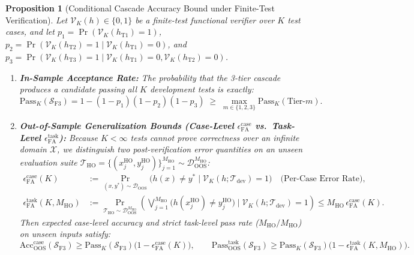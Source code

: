 \documentclass[10pt,a4paper]{article}
\newtheorem{proposition}{Proposition}
\begin{document}
\begin{proposition}[Conditional Cascade Accuracy Bound under Finite-Test Verification]
\label{prop:swarm_dominance}
Let $\mathcal{V}_K(h) \in \{0, 1\}$ be a finite-test functional verifier over $K$ test cases, and let $p_1 = \Pr(\mathcal{V}_K(h_{\text{T1}})=1)$, $p_2 = \Pr(\mathcal{V}_K(h_{\text{T2}})=1 \mid \mathcal{V}_K(h_{\text{T1}})=0)$, and $p_3 = \Pr(\mathcal{V}_K(h_{\text{T3}})=1 \mid \mathcal{V}_K(h_{\text{T1}})=0, \mathcal{V}_K(h_{\text{T2}})=0)$.
\begin{enumerate}
    \item \textbf{In-Sample Acceptance Rate:} The probability that the 3-tier cascade produces a candidate passing all $K$ development tests is exactly:
    \begin{equation}
    \label{eq:swarm_acc_insample}
    \text{Pass}_K(\mathcal{S}_{\text{F3}}) = 1 - (1 - p_1)(1 - p_2)(1 - p_3) \;\ge\; \max_{m \in \{1,2,3\}} \text{Pass}_K(\text{Tier-}m).
    \end{equation}
    \item \textbf{Out-of-Sample Generalization Bounds (Case-Level $\epsilon_{\text{FA}}^{\text{case}}$ vs.\ Task-Level $\epsilon_{\text{FA}}^{\text{task}}$):} Because $K < \infty$ tests cannot prove correctness over an infinite domain $\mathcal{X}$, we distinguish two post-verification error quantities on an unseen evaluation suite $\mathcal{T}_{\text{HO}} = \{(x_j^{\text{HO}}, y_j^{\text{HO}})\}_{j=1}^{M_{\text{HO}}} \sim \mathcal{D}_{\text{OOS}}^{M_{\text{HO}}}$:
    \begin{align}
    \epsilon_{\text{FA}}^{\text{case}}(K) &:= \Pr_{(x, y^*) \sim \mathcal{D}_{\text{OOS}}}\!\big(h(x) \neq y^* \;\big|\; \mathcal{V}_K(h; \mathcal{T}_{\text{dev}}) = 1\big) \quad \text{(Per-Case Error Rate)}, \\
    \epsilon_{\text{FA}}^{\text{task}}(K, M_{\text{HO}}) &:= \Pr_{\mathcal{T}_{\text{HO}} \sim \mathcal{D}_{\text{OOS}}^{M_{\text{HO}}}}\!\left(\bigvee_{j=1}^{M_{\text{HO}}} \big(h(x_j^{\text{HO}}) \neq y_j^{\text{HO}}\big) \;\Bigg|\; \mathcal{V}_K(h; \mathcal{T}_{\text{dev}}) = 1\right) \le M_{\text{HO}}\,\epsilon_{\text{FA}}^{\text{case}}(K).
    \end{align}
    Then expected case-level accuracy and strict task-level pass rate ($M_{\text{HO}}/M_{\text{HO}}$) on unseen inputs satisfy:
    \begin{equation}
    \label{eq:swarm_acc_oos}
    \text{Acc}_{\text{OOS}}^{\text{case}}(\mathcal{S}_{\text{F3}}) \ge \text{Pass}_K(\mathcal{S}_{\text{F3}})\big(1 - \epsilon_{\text{FA}}^{\text{case}}(K)\big), \qquad
    \text{Pass}_{\text{OOS}}^{\text{task}}(\mathcal{S}_{\text{F3}}) \ge \text{Pass}_K(\mathcal{S}_{\text{F3}})\big(1 - \epsilon_{\text{FA}}^{\text{task}}(K, M_{\text{HO}})\big).
    \end{equation}
\end{enumerate}
\end{proposition}
\end{document}
